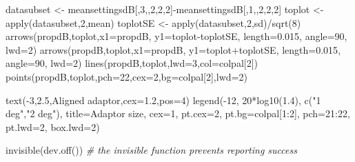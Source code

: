 \documentclass[
]{article}
\newenvironment{Shaded}{\begin{snugshade}}{\end{snugshade}}
\newcommand{\AttributeTok}[1]{\textcolor[rgb]{0.77,0.63,0.00}{#1}}
\newcommand{\CommentTok}[1]{\textcolor[rgb]{0.56,0.35,0.01}{\textit{#1}}}
\newcommand{\DecValTok}[1]{\textcolor[rgb]{0.00,0.00,0.81}{#1}}
\newcommand{\FloatTok}[1]{\textcolor[rgb]{0.00,0.00,0.81}{#1}}
\newcommand{\FunctionTok}[1]{\textcolor[rgb]{0.00,0.00,0.00}{#1}}
\newcommand{\NormalTok}[1]{#1}
\newcommand{\OtherTok}[1]{\textcolor[rgb]{0.56,0.35,0.01}{#1}}
\newcommand{\SpecialCharTok}[1]{\textcolor[rgb]{0.00,0.00,0.00}{#1}}
\newcommand{\StringTok}[1]{\textcolor[rgb]{0.31,0.60,0.02}{#1}}
\begin{document}
\begin{Shaded}
\begin{Highlighting}[]
\NormalTok{datasubset }\OtherTok{\textless{}{-}}\NormalTok{ meansettingsdB[,}\DecValTok{3}\NormalTok{,,}\DecValTok{2}\NormalTok{,}\DecValTok{2}\NormalTok{,}\DecValTok{2}\NormalTok{]}\SpecialCharTok{{-}}\NormalTok{meansettingsdB[,}\DecValTok{1}\NormalTok{,,}\DecValTok{2}\NormalTok{,}\DecValTok{2}\NormalTok{,}\DecValTok{2}\NormalTok{]}
\NormalTok{toplot }\OtherTok{\textless{}{-}} \FunctionTok{apply}\NormalTok{(datasubset,}\DecValTok{2}\NormalTok{,mean)}
\NormalTok{toplotSE }\OtherTok{\textless{}{-}} \FunctionTok{apply}\NormalTok{(datasubset,}\DecValTok{2}\NormalTok{,sd)}\SpecialCharTok{/}\FunctionTok{sqrt}\NormalTok{(}\DecValTok{8}\NormalTok{)}
\FunctionTok{arrows}\NormalTok{(propdB,toplot,}\AttributeTok{x1=}\NormalTok{propdB, }\AttributeTok{y1=}\NormalTok{toplot}\SpecialCharTok{{-}}\NormalTok{toplotSE, }\AttributeTok{length=}\FloatTok{0.015}\NormalTok{, }\AttributeTok{angle=}\DecValTok{90}\NormalTok{, }\AttributeTok{lwd=}\DecValTok{2}\NormalTok{)  }
\FunctionTok{arrows}\NormalTok{(propdB,toplot,}\AttributeTok{x1=}\NormalTok{propdB, }\AttributeTok{y1=}\NormalTok{toplot}\SpecialCharTok{+}\NormalTok{toplotSE, }\AttributeTok{length=}\FloatTok{0.015}\NormalTok{, }\AttributeTok{angle=}\DecValTok{90}\NormalTok{, }\AttributeTok{lwd=}\DecValTok{2}\NormalTok{)  }
\FunctionTok{lines}\NormalTok{(propdB,toplot,}\AttributeTok{lwd=}\DecValTok{3}\NormalTok{,}\AttributeTok{col=}\NormalTok{colpal[}\DecValTok{2}\NormalTok{])}
\FunctionTok{points}\NormalTok{(propdB,toplot,}\AttributeTok{pch=}\DecValTok{22}\NormalTok{,}\AttributeTok{cex=}\DecValTok{2}\NormalTok{,}\AttributeTok{bg=}\NormalTok{colpal[}\DecValTok{2}\NormalTok{],}\AttributeTok{lwd=}\DecValTok{2}\NormalTok{)}

\FunctionTok{text}\NormalTok{(}\SpecialCharTok{{-}}\DecValTok{3}\NormalTok{,}\FloatTok{2.5}\NormalTok{,}\StringTok{\textquotesingle{}Aligned adaptor\textquotesingle{}}\NormalTok{,}\AttributeTok{cex=}\FloatTok{1.2}\NormalTok{,}\AttributeTok{pos=}\DecValTok{4}\NormalTok{)}
\FunctionTok{legend}\NormalTok{(}\SpecialCharTok{{-}}\DecValTok{12}\NormalTok{, }\DecValTok{20}\SpecialCharTok{*}\FunctionTok{log10}\NormalTok{(}\FloatTok{1.4}\NormalTok{), }\FunctionTok{c}\NormalTok{(}\StringTok{"1 deg"}\NormalTok{,}\StringTok{"2 deg"}\NormalTok{), }\AttributeTok{title=}\StringTok{\textquotesingle{}Adaptor size\textquotesingle{}}\NormalTok{, }
       \AttributeTok{cex=}\DecValTok{1}\NormalTok{, }\AttributeTok{pt.cex=}\DecValTok{2}\NormalTok{, }\AttributeTok{pt.bg=}\NormalTok{colpal[}\DecValTok{1}\SpecialCharTok{:}\DecValTok{2}\NormalTok{], }\AttributeTok{pch=}\DecValTok{21}\SpecialCharTok{:}\DecValTok{22}\NormalTok{, }\AttributeTok{pt.lwd=}\DecValTok{2}\NormalTok{, }\AttributeTok{box.lwd=}\DecValTok{2}\NormalTok{)}

\FunctionTok{invisible}\NormalTok{(}\FunctionTok{dev.off}\NormalTok{()) }\CommentTok{\# the invisible function prevents reporting success}
\end{Highlighting}
\end{Shaded}
\end{document}
